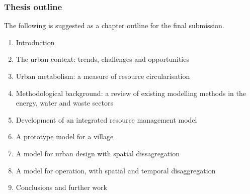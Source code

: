 \subsubsection*{Thesis outline}
The following is suggested as a chapter outline for the final submission.
\begin{enumerate}
	\item Introduction
	\item The urban context: trends, challenges and opportunities
	\item Urban metabolism: a measure of resource circularisation
	\item Methodological background: a review of existing modelling methods in the energy, water and waste sectors
	\item Development of an integrated resource management model
	\item A prototype model for a village
	\item A model for urban design with spatial dissagregation
	\item A model for operation, with spatial and temporal disaggregation
	\item Conclusions and further work
\end{enumerate}

